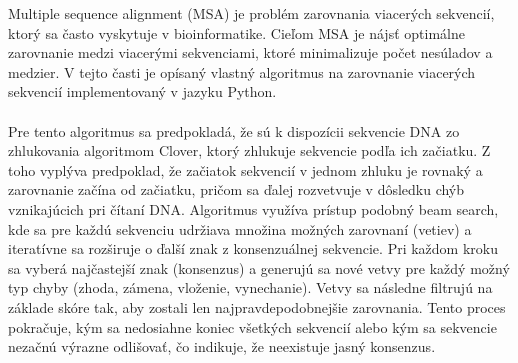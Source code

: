 Multiple sequence alignment (MSA) je problém zarovnania viacerých sekvencií, ktorý sa často vyskytuje v bioinformatike. Cieľom MSA je nájsť optimálne zarovnanie medzi viacerými sekvenciami, ktoré minimalizuje počet nesúladov a medzier. V tejto časti je opísaný vlastný algoritmus na zarovnanie viacerých sekvencií implementovaný v jazyku Python.
\\
\\Pre tento algoritmus sa predpokladá, že sú k dispozícii sekvencie DNA zo zhlukovania algoritmom Clover, ktorý zhlukuje sekvencie podľa ich začiatku. Z toho vyplýva predpoklad, že začiatok sekvencií v jednom zhluku je rovnaký a zarovnanie začína od začiatku, pričom sa ďalej rozvetvuje v dôsledku chýb vznikajúcich pri čítaní DNA.
Algoritmus využíva prístup podobný beam search, kde sa pre každú sekvenciu udržiava množina možných zarovnaní (vetiev) a iteratívne sa rozširuje o ďalší znak z konsenzuálnej sekvencie. Pri každom kroku sa vyberá najčastejší znak (konsenzus) a generujú sa nové vetvy pre každý možný typ chyby (zhoda, zámena, vloženie, vynechanie). Vetvy sa následne filtrujú na základe skóre tak, aby zostali len najpravdepodobnejšie zarovnania. Tento proces pokračuje, kým sa nedosiahne koniec všetkých sekvencií alebo kým sa sekvencie nezačnú výrazne odlišovať, čo indikuje, že neexistuje jasný konsenzus.

